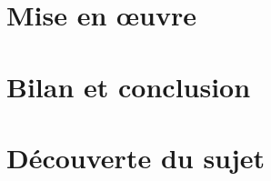 \documentclass[noposter]{polytech}
\begin{document}
\chapter{Mise en œuvre}
\chapter{Bilan et conclusion}
\appendix
\chapter{Découverte du sujet}
\end{document}
